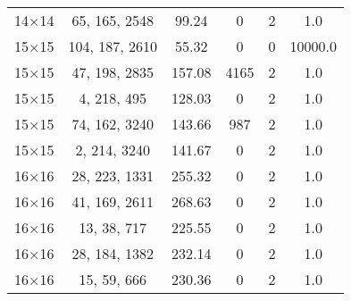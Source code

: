 \documentclass[main.tex]{subfiles}
\begin{document}
\begin{table}
\begin{tabular}{
    cccccc}
14$\times$14 &65, 165, 2548 &99.24 &0 &2 &1.0\\
15$\times$15 &104, 187, 2610 &55.32 &0 &0 &10000.0\\
15$\times$15 &47, 198, 2835 &157.08 &4165 &2 &1.0\\
15$\times$15 &4, 218, 495 &128.03 &0 &2 &1.0\\
15$\times$15 &74, 162, 3240 &143.66 &987 &2 &1.0\\
15$\times$15 &2, 214, 3240 &141.67 &0 &2 &1.0\\
16$\times$16 &28, 223, 1331 &255.32 &0 &2 &1.0\\
16$\times$16 &41, 169, 2611 &268.63 &0 &2 &1.0\\
16$\times$16 &13, 38, 717 &225.55 &0 &2 &1.0\\
16$\times$16 &28, 184, 1382 &232.14 &0 &2 &1.0\\
16$\times$16 &15, 59, 666 &230.36 &0 &2 &1.0\\
    \end{tabular}
\end{table}
\end{document}
